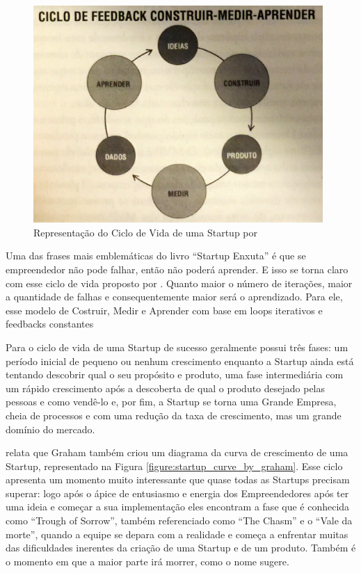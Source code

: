 \begin{figure}[!htb]
\centering
\includegraphics[width=11cm,angle=0]{figuras/ciclo_de_vida_eric_ries}
\caption{Representação do Ciclo de Vida de uma Startup por \cite{Ries2011}}
\label{figure:ciclo_de_vida_eric_ries}
\end{figure}

Uma das frases mais emblemáticas do livro ``Startup Enxuta'' é que se empreendedor não pode falhar, então não poderá aprender. E isso se torna claro com esse ciclo de vida proposto por . Quanto maior o número de iterações, maior a quantidade de falhas e consequentemente maior será o aprendizado. Para ele, esse modelo de Costruir, Medir e Aprender com base em loops iterativos e feedbacks constantes

Para  o ciclo de vida de uma Startup de sucesso geralmente possui três fases: um período inicial de pequeno ou nenhum crescimento enquanto a Startup ainda está tentando descobrir qual o seu propósito e produto, uma fase intermediária com um rápido crescimento após a descoberta de qual o produto desejado pelas pessoas e como vendê-lo e, por fim, a Startup se torna uma Grande Empresa, cheia de processos e com uma redução da taxa de crescimento, mas um grande domínio do mercado.

 relata que Graham também criou um diagrama da curva de crescimento de uma Startup, representado na Figura \ref{figure:startup_curve_by_graham}. Esse ciclo apresenta um momento muito interessante que quase todas as Startups precisam superar: logo após o ápice de entusiasmo e energia dos Empreendedores após ter uma ideia e começar a sua implementação eles encontram a fase que é conhecida como ``Trough of Sorrow'', também referenciado como ``The Chasm'' e o ``Vale da morte'', quando a equipe se depara com a realidade e começa a enfrentar muitas das dificuldades inerentes da criação de uma Startup e de um produto. Também é o momento em que a maior parte irá morrer, como o nome sugere.

